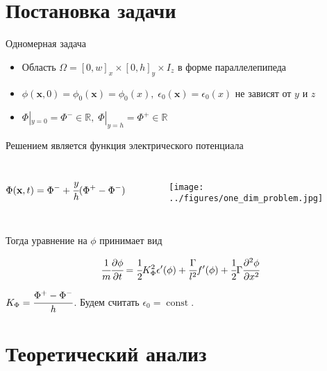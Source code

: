 \documentclass[aspectratio=169]{beamer}
\DeclareMathOperator{\Const}{const}
\newcommand*{\hm}[1]{#1\nobreak\discretionary{}
{\hbox{$\mathsurround=0pt #1$}}{}}
\begin{document}
\section{Постановка задачи}

\begin{frame}{Одномерная задача}
\vspace{-0.3cm}
\begin{itemize}
	\item Область $\Omega = [0, w]_x \times [0, h]_y \times I_z$ в форме параллелепипеда
	\item $\phi(\textbf{x}, 0) = \phi_0(\textbf{x}) = \phi_0(x), \; \epsilon_0(\textbf{x}) =
	\epsilon_0(x)$ не зависят от $y$ и $z$
	\item $\Phi|_{y = 0} = \Phi^- \in \mathbb{R}, \; \Phi|_{y = h} = \Phi^+ \in \mathbb{R}$
\end{itemize}
\vspace{0.3cm}
Решением является функция электрического потенциала
\begin{columns}
\vspace{-1cm}
$$\Phi(\textbf{x}, t) = \Phi^- \hm + \cfrac{y}{h}(\Phi^+ - \Phi^-)$$
\begin{figure}
	\vspace*{-2cm}
	\hspace*{0.5cm}
	\texttt{[image: ../figures/one\_dim\_problem.jpg]}
\end{figure}
\end{columns}
\vspace{-0.4cm}
Тогда уравнение на $\phi$ принимает вид
\begin{block}{}
	$$\cfrac{1}{m} \cfrac{\partial \phi}{\partial t} = \cfrac{1}{2} K_\Phi^2 \epsilon'(\phi) +
	\cfrac{\Gamma}{l^2} f'(\phi) + \cfrac{1}{2} \Gamma \cfrac{\partial^2 \phi}{\partial x^2}$$
\end{block}
$K_\Phi = \cfrac{\Phi^+ - \Phi^-}{h}$. Будем считать $\epsilon_0 = \Const$.
\end{frame}


\section{Теоретический анализ}
\end{document}
